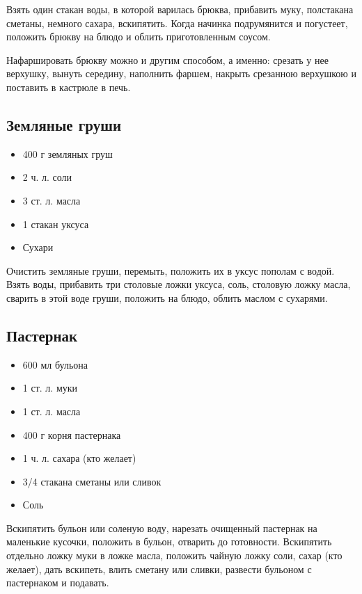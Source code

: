 Взять один стакан воды, в которой варилась брюква, прибавить муку, полстакана сметаны, немного сахара, вскипятить. Когда начинка подрумянится и погустеет, положить брюкву на блюдо и облить приготовленным соусом.

Нафаршировать брюкву можно и другим способом, а именно: срезать у нее верхушку, вынуть середину, наполнить фаршем, накрыть срезанною верхушкою и поставить в кастрюле в печь.

\subsection{Земляные груши}

\begin{itemize}
	\item 400 г земляных груш 
    \item 2 ч. л. соли 
    \item 3 ст. л. масла 
    \item 1 стакан уксуса 
    \item Сухари
\end{itemize}

Очистить земляные груши, перемыть, положить их в уксус пополам с водой. Взять воды, прибавить три столовые ложки уксуса, соль, столовую ложку масла, сварить в этой воде груши, положить на блюдо, облить маслом с сухарями.

\subsection{Пастернак}

\begin{itemize}
	\item 600 мл бульона 
    \item 1 ст. л. муки 
    \item 1 ст. л. масла 
    \item 400 г корня пастернака 
    \item 1 ч. л. сахара (кто желает) 
    \item 3/4 стакана сметаны или сливок 
    \item Соль
\end{itemize}

Вскипятить бульон или соленую воду, нарезать очищенный пастернак на маленькие кусочки, положить в бульон, отварить до готовности. Вскипятить отдельно ложку муки в ложке масла, положить чайную ложку соли, сахар (кто желает), дать вскипеть, влить сметану или сливки, развести бульоном с пастернаком и подавать.


